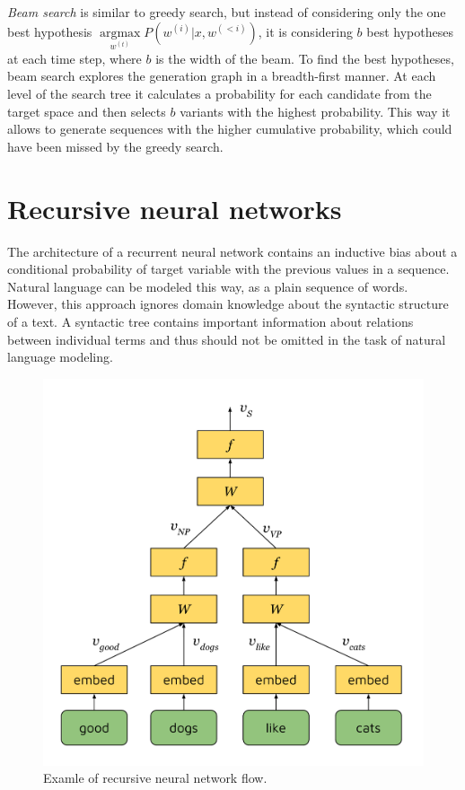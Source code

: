 \emph{Beam search} is similar to greedy search, but instead of considering only the one best hypothesis $\underset{w^{(t)}}{\operatorname{argmax}} P(w^{(i)}|x, w^{(<i)})$, it is considering $b$ best hypotheses at each time step, where $b$ is the width of the beam. To find the best hypotheses, beam search explores the generation graph in a breadth-first manner. At each level of the search tree it calculates a probability for each candidate from the target space and then selects $b$ variants with the highest probability. This way it allows to generate sequences with the higher cumulative probability, which could have been missed by the greedy search.

\section{Recursive neural networks} \label{sec:rvnn}
The architecture of a recurrent neural network contains an inductive bias about a conditional probability of target variable with the previous values in a sequence. Natural language can be modeled this way, as a plain sequence of words. However, this approach ignores domain knowledge about the syntactic structure of a text. A syntactic tree contains important information about relations between individual terms and thus should not be omitted in the task of natural language modeling.

\begin{figure}[h]
\centering
\includegraphics[width=5in]{Figures/rvnn.pdf}
\decoRule
\caption[RvNN flow]{Examle of recursive neural network flow.}
\label{fig:rvnn}
\end{figure}

